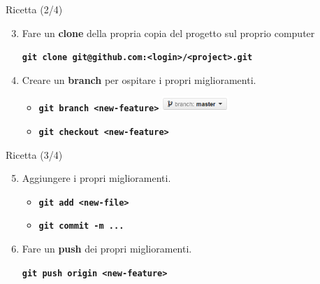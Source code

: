 \documentclass{beamer}
\begin{document}
\begin{frame}{\centerline{Ricetta (2/4)}}
  \begin{enumerate}
  \setcounter{enumi}{2}
  \item Fare un \textbf{clone} della propria copia del progetto sul proprio computer
    \begin{center}
        \texttt{\textbf{git clone git@github.com:<login>/<project>.git}}
    \end{center}
  \item Creare un \textbf{branch} per ospitare i propri miglioramenti.
    \begin{itemize}
    \item \texttt{\textbf{git branch <new-feature>}} \includegraphics[height=0.55cm]{UniBo.IDSEPC.A2023.LavoroCondiviso/github-branch}
    \item \texttt{\textbf{git checkout <new-feature>}}
    \end{itemize}
  \end{enumerate}
\end{frame}

\begin{frame}{\centerline{Ricetta (3/4)}}
  \begin{enumerate}
    \setcounter{enumi}{4}
  \item Aggiungere i propri miglioramenti.
    \begin{itemize}
    \item \texttt{\textbf{git add <new-file>}}
    \item \texttt{\textbf{git commit -m ...}}
    \end{itemize}    
  \item Fare un \textbf{push} dei propri miglioramenti.
    \begin{center}
      \texttt{\textbf{git push origin <new-feature>}}
    \end{center}
  \end{enumerate}
\end{frame}
\end{document}
